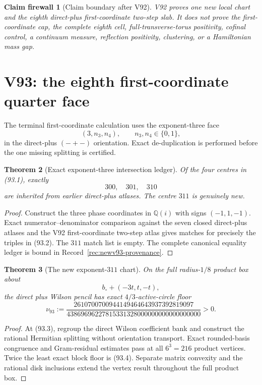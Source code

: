 \documentclass[11pt,oneside]{article}
\newtheorem{theorem}{Theorem}[section]
\newtheorem{firewall}[theorem]{Claim firewall}
\theoremstyle{definition}
\theoremstyle{remark}
\begin{document}
\begin{firewall}[Claim boundary after V92]
\label{fire:newv92-final}
V92 proves one new local chart and the eighth direct-plus
first-coordinate two-step slab.  It does not prove the
first-coordinate cap, the complete eighth cell,
full-transverse-torus positivity, cofinal control, a continuum
measure, reflection positivity, clustering, or a Hamiltonian mass
gap.
\end{firewall}

\section{V93: the eighth first-coordinate quarter face}
\label{sec:newv93-eighth-first-quarter}

The terminal first-coordinate calculation uses the exponent-three
face
\[
 (3,n_3,n_4),\qquad n_3,n_4\in\{0,1\},              \tag{93.1}
\]
in the direct-plus \((-+-)\) orientation.  Exact de-duplication is
performed before the one missing splitting is certified.

\begin{theorem}[Exact exponent-three intersection ledger]
\label{thm:newv93-intersection}
Of the four centres in (93.1), exactly
\[
 300,\quad301,\quad310                                \tag{93.2}
\]
are inherited from earlier direct-plus atlases.  The centre \(311\)
is genuinely new.
\end{theorem}

\begin{proof}
Construct the three phase coordinates in \(\mathbb Q(i)\) with
signs \((-1,1,-1)\).  Exact numerator--denominator comparison
against the seven closed direct-plus atlases and the V92
first-coordinate two-step atlas gives matches for precisely the
triples in (93.2).  The \(311\) match list is empty.  The complete
canonical equality ledger is bound in
Record~\ref{rec:newv93-provenance}.
\end{proof}

\begin{theorem}[The new exponent-\(311\) chart]
\label{thm:newv93-new-chart}
On the full radius-\(1/8\) product box about
\[
 b_\circ+(-3t,t,-t),                                 \tag{93.3}
\]
the direct plus Wilson pencil has exact \(4/3\)-active-circle floor
\[
\nu_{93}:=
\frac{2610700700944149464643937392819097}
     {43869696227815331328000000000000000000}>0.      \tag{93.4}
\]
\end{theorem}

\begin{proof}
At (93.3), regroup the direct Wilson coefficient bank and construct
the rational Hermitian splitting without orientation transport.
Exact rounded-basis congruence and Gram-residual estimates pass at
all \(6^3=216\) product vertices.  Twice the least exact block floor
is (93.4).  Separate matrix convexity and the rational disk
inclusions extend the vertex result throughout the full product
box.
\end{proof}
\end{document}
